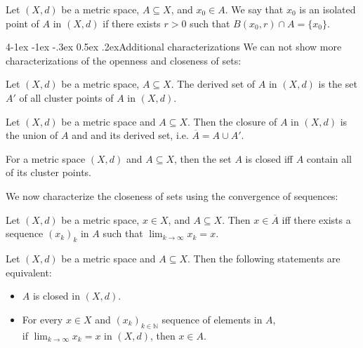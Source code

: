 \documentclass{tufte-handout}
\makeatletter
\renewcommand{\paragraph}{\@startsection{paragraph}%
    {4}{\z@}{-1ex \@plus -1ex \@minus -.3ex}%
    {0.5ex \@plus .2ex}{\normalfont\normalsize\bfseries}}
\makeatother
\begin{document}
\begin{Definition}
    Let \((X, d)\) be a metric space, \( A \subseteq X \), and \( x_0 \in A \).
    We say that \( x_0 \) is an isolated point of \( A \) in \( (X, d) \) if
    there exists \( r > 0 \) such that \( B(x_0, r) \cap A = \{x_0\} \).
\end{Definition}

\paragraph{Additional characterizations}
We can not show more characterizations of the openness and closeness of sets:
\begin{Definition}
    Let \((X, d)\) be a metric space, \( A \subseteq X \). The derived set 
of \( A \) in \( (X, d) \) is the set \( A' \) of all cluster points of \( A \) in \( (X, d) \).
\end{Definition}
\begin{Proposition}
    Let \((X, d)\) be a metric space and \( A \subseteq X \). Then
    the closure of \( A \) in \( (X, d) \) is the union of \( A \) and and its derived set, 
    i.e. \( \overline{A} = A \cup A' \).
\end{Proposition}

\begin{Theorem}
    For a metric space \( (X, d) \) and \( A \subseteq X \), then
    the set \( A \) is closed iff \( A \) contain all of its cluster points.
\end{Theorem}

We now characterize the closeness of sets using the convergence of sequences:
\begin{Proposition}
    Let \((X,d)\) be a metric space, \( x \in X \), and \(A \subseteq X\). Then 
    \(x\in \overline A\) iff there exists a sequence \( (x_k)_k \) in \( A \) such that \( \lim_{k\to \infty} x_k = x \).
\end{Proposition}



\begin{Theorem}
    Let \((X, d)\) be a metric space and \( A \subseteq X \). Then the following statements are equivalent:
    \begin{itemize}
        \item \( A \) is closed in \( (X, d) \).
        \item For every \( x\in X \) and \((x_k)_{k\in \mathbb{N}}\) sequence of elements in \( A \), \\
        if \(\lim_{k\to \infty} x_k = x\) in \( (X, d) \), then \( x \in A \).
    \end{itemize}
\end{Theorem}
\end{document}
